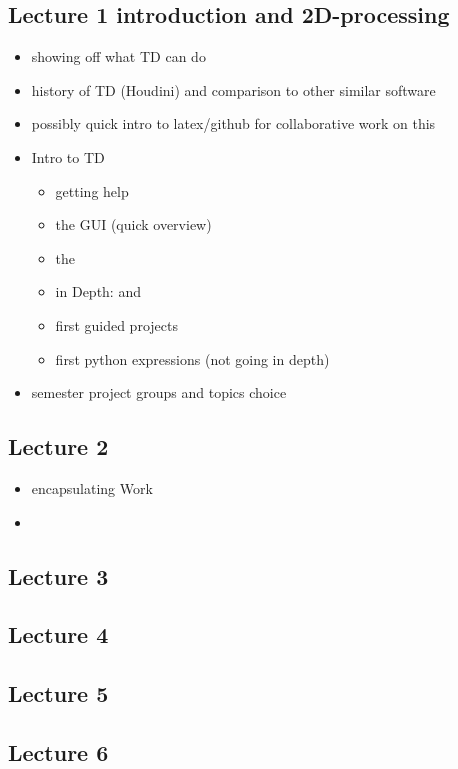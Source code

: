 \subsection{Lecture 1 introduction and 2D-processing} %
\label{sub:lecture_1}
\begin{itemize}
	\item showing off what TD can do
	\item history of TD (Houdini) and comparison to other similar software
	\item possibly quick intro to latex/github for collaborative work on this
	\item Intro to TD
		\begin{itemize}
		\item getting help
		\item the GUI (quick overview)
		\item the \OPs
		\item in Depth: \TOPs and \CHOPs
		\item first guided projects
		\item first python expressions (not going in depth)
		\end{itemize}
	\item semester project groups and topics choice
\end{itemize}

\subsection{Lecture 2}
\label{sub:lecture_2}
\begin{itemize}
	\item encapsulating Work
	\item 
\end{itemize}

\subsection{Lecture 3}
\label{sub:lecture_3}

\subsection{Lecture 4}
\label{sub:lecture_4}

\subsection{Lecture 5}
\label{sub:lecture_5}

\subsection{Lecture 6}
\label{sub:lecture_6}


